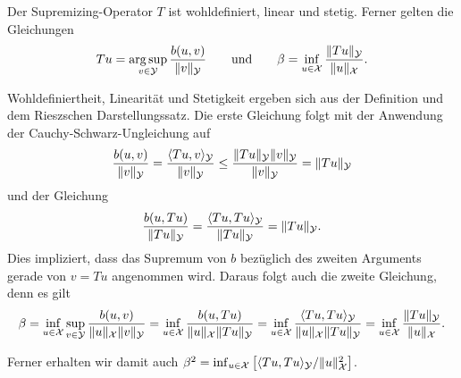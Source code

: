 \documentclass[../main.tex]{subfiles}
\begin{document}
\begin{Lemma}\label{lemma:supremizing_operator}
    Der Supremizing-Operator $T$ ist wohldefiniert, linear und stetig.
    Ferner gelten die Gleichungen
    \begin{equation}
        \label{eq:supremizing_operator_ist_argsup}
        Tu = \operatorname*{arg\,sup}_{v \in \mathcal Y} \frac{b(u, v)}{\lVert v\rVert_{\mathcal Y}}
        \qquad\text{und}\qquad
        \beta = \inf_{u \in \mathcal X} \frac{\lVert Tu\rVert_{\mathcal Y}}{\lVert u\rVert_{\mathcal X}}.
    \end{equation}

    \begin{Beweis}
        Wohldefiniertheit, Linearität und Stetigkeit ergeben sich aus der Definition und dem Rieszschen Darstellungssatz.
        Die erste Gleichung folgt mit der Anwendung der Cauchy-Schwarz-Ungleichung auf
        \begin{equation}
            \frac{b(u, v)}{\lVert v\rVert_{\mathcal Y}}
            = \frac{\langle Tu,v\rangle_{\mathcal Y}}{\lVert v\rVert_{\mathcal Y}}
            \leq \frac{\lVert Tu\rVert_{\mathcal Y} \lVert v\rVert_{\mathcal Y}}{\lVert v\rVert_{\mathcal Y}}
            = \lVert Tu\rVert_{\mathcal Y}
        \end{equation}
        und der Gleichung
        \begin{equation}
            \frac{b(u, Tu)}{\lVert Tu\rVert_{\mathcal Y}}
            = \frac{\langle Tu,Tu\rangle_{\mathcal Y}}{\lVert Tu\rVert_{\mathcal Y}}
            = \lVert Tu\rVert_{\mathcal Y}.
        \end{equation}
        Dies impliziert, dass das Supremum von $b$ bezüglich des zweiten Arguments gerade von $v = Tu$ angenommen wird.
        Daraus folgt auch die zweite Gleichung, denn es gilt
        \begin{equation}
            \beta
            = \inf_{u \in \mathcal X} \sup_{v \in \mathcal Y} \frac{b(u, v)}{\lVert u\rVert_{\mathcal X} \lVert v\rVert_{\mathcal Y}}
            = \inf_{u \in \mathcal X} \frac{b(u, Tu)}{\lVert u\rVert_{\mathcal X} \lVert Tu\rVert_{\mathcal Y}}
            = \inf_{u \in \mathcal X} \frac{\langle Tu,Tu\rangle_{\mathcal Y}}{\lVert u\rVert_{\mathcal X}\lVert Tu\rVert_{\mathcal Y}}
            = \inf_{u \in \mathcal X} \frac{\lVert Tu\rVert_{\mathcal Y}}{\lVert u\rVert_{\mathcal X}}.
        \end{equation}
    \end{Beweis}
\end{Lemma}
Ferner erhalten wir damit auch $\beta^{2} = \inf_{u \in \mathcal X} \left[{\langle Tu,Tu\rangle_{\mathcal Y}}/{\lVert u\rVert_{\mathcal X}^{2}}\right]$.
\end{document}
